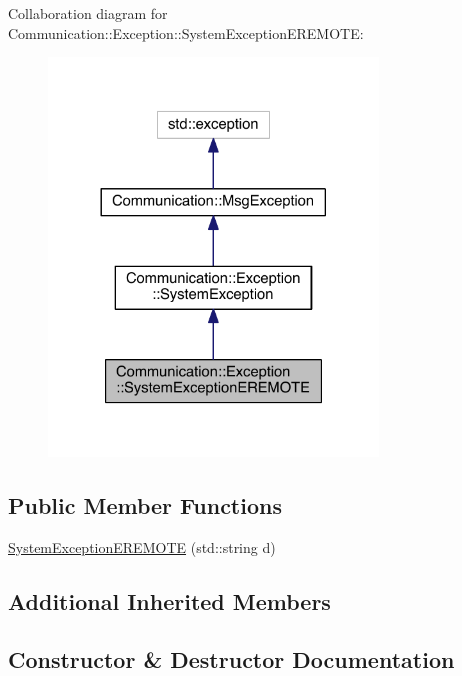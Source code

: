 Collaboration diagram for Communication\+:\+:Exception\+:\+:System\+Exception\+E\+R\+E\+M\+O\+T\+E\+:\nopagebreak
\begin{figure}[H]
\begin{center}
\leavevmode
\includegraphics[width=248pt]{class_communication_1_1_exception_1_1_system_exception_e_r_e_m_o_t_e__coll__graph}
\end{center}
\end{figure}
\subsection*{Public Member Functions}
\begin{DoxyCompactItemize}
\item 
\hyperlink{class_communication_1_1_exception_1_1_system_exception_e_r_e_m_o_t_e_a891767eb1355b2909a6e29bc47f22703}{System\+Exception\+E\+R\+E\+M\+O\+T\+E} (std\+::string d)
\end{DoxyCompactItemize}
\subsection*{Additional Inherited Members}


\subsection{Constructor \& Destructor Documentation}
\hypertarget{class_communication_1_1_exception_1_1_system_exception_e_r_e_m_o_t_e_a891767eb1355b2909a6e29bc47f22703}{}
